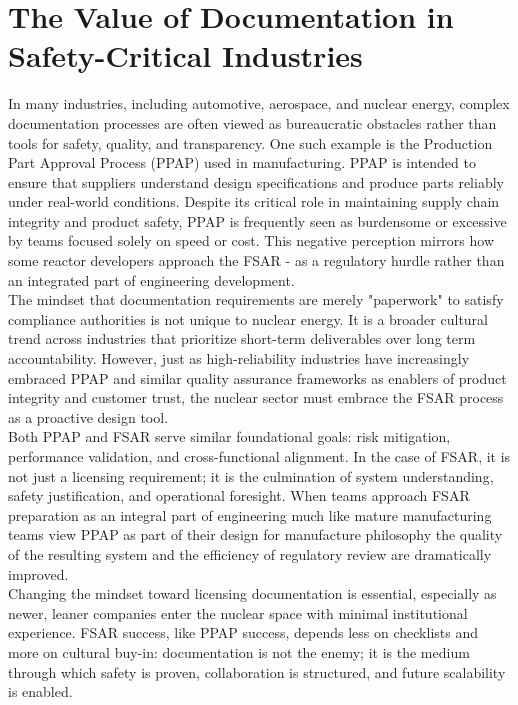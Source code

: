 \documentclass[5p,authoryear]{elsarticle}
\begin{document}
\section{The Value of Documentation in Safety-Critical Industries}
\vspace{0.2cm}

In many industries, including automotive, aerospace, and nuclear energy, complex documentation processes are often viewed as bureaucratic obstacles rather than tools for safety, quality, and transparency. One such example is the Production Part Approval Process (PPAP) used in manufacturing. PPAP is intended to ensure that suppliers understand design specifications and produce parts reliably under real-world conditions. Despite its critical role in maintaining supply chain integrity and product safety, PPAP is frequently seen as burdensome or excessive by teams focused solely on speed or cost. This negative perception mirrors how some reactor developers approach the FSAR - as a regulatory hurdle rather than an integrated part of engineering development.\\

The mindset that documentation requirements are merely "paperwork" to satisfy compliance authorities is not unique to nuclear energy. It is a broader cultural trend across industries that prioritize short-term deliverables over long term accountability. However, just as high-reliability industries have increasingly embraced PPAP and similar quality assurance frameworks as enablers of product integrity and customer trust, the nuclear sector must embrace the FSAR process as a proactive design tool.\\

Both PPAP and FSAR serve similar foundational goals: risk mitigation, performance validation, and cross-functional alignment. In the case of FSAR, it is not just a licensing requirement; it is the culmination of system understanding, safety justification, and operational foresight. When teams approach FSAR preparation as an integral part of engineering much like mature manufacturing teams view PPAP as part of their design for manufacture philosophy the quality of the resulting system and the efficiency of regulatory review are dramatically improved.\\

Changing the mindset toward licensing documentation is essential, especially as newer, leaner companies enter the nuclear space with minimal institutional experience. FSAR success, like PPAP success, depends less on checklists and more on cultural buy-in: documentation is not the enemy; it is the medium through which safety is proven, collaboration is structured, and future scalability is enabled.
\end{document}
